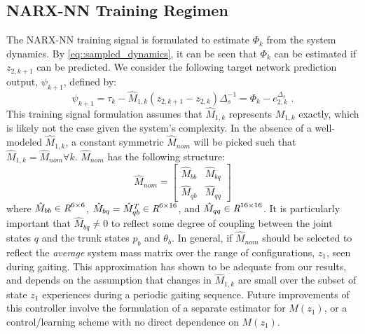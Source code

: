 		\subsection{NARX-NN Training Regimen}
			
			The  NARX-NN training signal is formulated to estimate $\Phi_{k}$ from the system dynamics. By \ref{eq::sampled_dynamics}, it can be seen that $\Phi_{k}$ can be estimated if ${z}_{2,k+1}$ can be predicted. We consider the following target network prediction output, $\psi_{k+1}$,  defined by:
				\vspace{-2mm}
				\begin{equation}
					\psi_{k+1} = \tau_{k} - \hat{M}_{1,k}({z}_{2,k+1} - {z}_{2,k})\Delta_{s}^{-1} = \Phi_{k} - {e}_{2,k}^{\Delta_{s}} \text{ .}
					\label{eq::training_signal}
				\end{equation}
			This training signal formulation assumes that $\hat{M}_{1,k}$ represents $M_{1,k}$ exactly, which is likely not the case given the system's complexity. In the absence of a well-modeled $\hat{M}_{1,k}$, a constant symmetric $\hat{M}_{nom}$ will be picked such that $\hat{M}_{1,k} = \hat{M}_{nom} \forall k$. $\hat{M}_{nom}$ has the following structure:
				\begin{equation}
					\hat{M}_{nom} = \left[
						\begin{array}{cc}
						\hat{M}_{bb}	&	 \hat{M}_{bq}\\
						\hat{M}_{qb}	&	 \hat{M}_{qq}
						\end{array}
					\right]
				\end{equation}
			where 	$\hat{M}_{bb}\in \emph{R}^{6\times6}$, 
					$\hat{M}_{bq}=\hat{M}_{qb}^{T} \in \emph{R}^{6\times16}$, and  
					$\hat{M}_{qq}\in \emph{R}^{16\times16}$. 
			It is particularly important that $\hat{M}_{bq}\neq0$ to reflect some degree of coupling between the joint states $q$ and the trunk states ${p}_{b}$ and $\theta_{b}$. In general, if $\hat{M}_{nom}$ should be selected to reflect the \emph{average} system mass matrix over the range of configurations, $z_{1}$, seen during gaiting. This approximation has shown to be adequate from our results, and depends on the assumption that changes in $\hat{M}_{1,k}$ are small  over the subset of state $z_{1}$ experiences during a periodic gaiting sequence. Future improvements of this controller involve the formulation of a separate estimator for $M(z_{1})$, or a control/learning scheme with no direct dependence on $M(z_{1})$.

